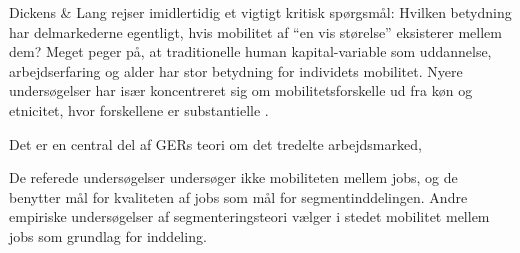 Dickens \& Lang rejser imidlertidig et vigtigt kritisk spørgsmål: Hvilken betydning har delmarkederne egentligt, hvis mobilitet af “en vis størelse” eksisterer mellem dem?  Meget peger på, at traditionelle human kapital-variable som uddannelse, arbejdserfaring og alder har stor betydning for individets mobilitet. Nyere undersøgelser har især koncentreret sig om mobilitetsforskelle ud fra køn og etnicitet, hvor forskellene er substantielle \parencite[93-4]{Leontaridi1998}. %








Det er en central del af GERs teori om det tredelte arbejdsmarked,

 De referede undersøgelser undersøger ikke mobiliteten mellem jobs, og de benytter mål for kvaliteten af jobs som mål for segmentinddelingen. Andre empiriske undersøgelser af segmenteringsteori vælger i stedet mobilitet mellem jobs som grundlag for inddeling.





% 

%
%
%
%
%
%
%
%
%
%
%











